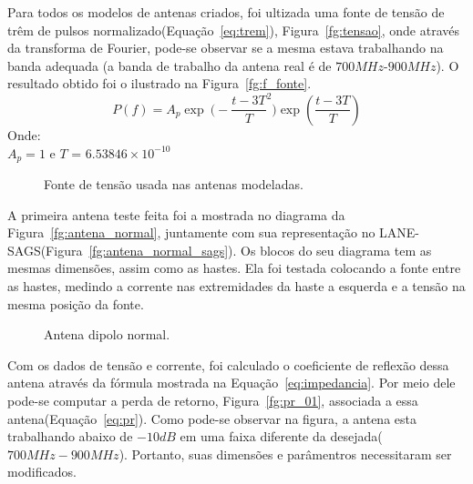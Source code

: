 Para todos os modelos de antenas criados, foi ultizada uma fonte de tensão de trêm de pulsos normalizado(Equação~\ref{eq:trem}), Figura~\ref{fg:tensao}, onde através da transforma de Fourier, pode-se observar se a mesma estava trabalhando na banda adequada (a banda de trabalho da antena real é de $700MHz$-$900MHz$). O resultado obtido foi o ilustrado na Figura~\ref{fg:f_fonte}.\\

\begin{equation}\label{eq:trem}
	P(f) = A_p\exp~\big(-{\frac{t-3T}{T}}^{2}\big)\exp(\frac{t-3T}{T})
\end{equation}
Onde:\\
$A_p = 1$ e $T$ =  $6.53846\times10^{-10}$
\begin{figure}[!ht]
	\begin{center}
\qquad
	\end{center}
	\caption{Fonte de tensão usada nas antenas modeladas.}
	\label{fg:fontes}
\end{figure}

A primeira antena teste feita foi a mostrada no diagrama da Figura~\ref{fg:antena_normal}, juntamente com sua representação no LANE-SAGS(Figura~\ref{fg:antena_normal_sags}). Os blocos do seu diagrama tem as mesmas dimensões, assim como as hastes. Ela foi testada colocando a fonte entre as hastes, medindo a corrente nas extremidades da haste a esquerda e a tensão na mesma posição da fonte. \\

\begin{figure}[!ht]
	\begin{center}
\qquad
	\end{center}
	\caption{Antena dipolo normal.}
	\label{fg:antena_normal_m}
\end{figure}

Com os dados de tensão e corrente, foi calculado o coeficiente de reflexão dessa antena através da fórmula mostrada na Equação~\ref{eq:impedancia}. Por meio dele pode-se computar a perda de retorno, Figura~\ref{fg:pr_01}, associada a essa antena(Equação~\ref{eq:pr}). Como pode-se observar na figura, a antena esta trabalhando abaixo de $-10dB$ em uma faixa diferente da desejada($700MHz-900MHz$). Portanto, suas dimensões e parâmentros necessitaram ser modificados.\\


